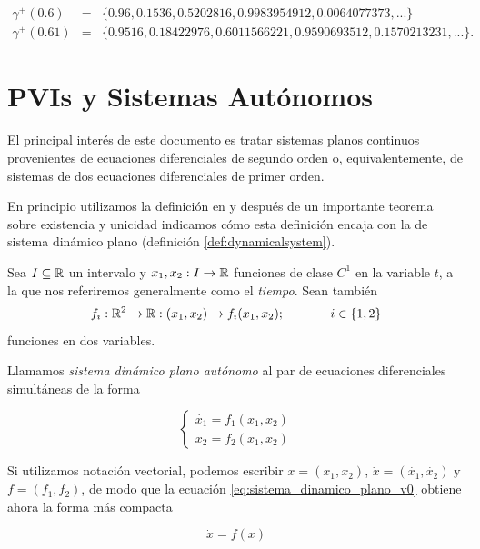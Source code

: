 \begin{example}
$$
	\begin{array}{lll}
		\gamma^+(0.6) & = & \{ 0.96, 0.1536, 0.5202816, 0.9983954912, 0.0064077373, ... \} \\
	\gamma^+(0.61) & = & \{ 0.9516, 0.18422976, 0.6011566221, 0.9590693512, 0.1570213231, ... \}.
	\end{array}
$$

\end{example}

\section{PVIs y Sistemas Autónomos}
\label{sec:propiedades_generales}

El principal interés de este documento es tratar sistemas planos continuos provenientes de ecuaciones diferenciales de segundo orden o, equivalentemente, de sistemas de dos ecuaciones diferenciales de primer orden.

En principio utilizamos la definición en \cite[p.~174]{dynandbif} y después de un importante teorema sobre existencia y unicidad indicamos cómo esta definición encaja con la de sistema dinámico plano (definición \ref{def:dynamicalsystem}).

\begin{definition} \label{def:sistema_dinamico_plano}
Sea $I \subseteq {\ensuremath{\mathbb{R}}}$ un intervalo y $x_1,x_2:I \rightarrow {\ensuremath{\mathbb{R}}}$ funciones de clase $C^1$ en la variable $t$, a la que nos referiremos generalmente como el \textit{tiempo}.
Sean también $$f_i : {\mathbb{R}}^2 \rightarrow {\ensuremath{\mathbb{R}}}: (x_1, x_2) \rightarrow f_i(x_1, x_2); \hspace{0.5in} i \in \{1,2\}$$ funciones en dos variables.

Llamamos \emph{sistema dinámico plano autónomo} al par de ecuaciones diferenciales simultáneas de la forma

\begin{equation} \label{eq:sistema_dinamico_plano_v0}
\left\{
    \begin{array}{l}
        \dot{x_1} = f_1(x_1, x_2) \\
        \dot{x_2} = f_2(x_1, x_2)
    \end{array} \right.
\end{equation}
\end{definition}

\begin{remark}
Si utilizamos notación vectorial, podemos escribir $x = (x_1, x_2)$, $\dot{x} = (\dot{x_1}, \dot{x_2})$ y $f = (f_1, f_2)$, de modo que la ecuación \ref{eq:sistema_dinamico_plano_v0} obtiene ahora la forma más compacta

\begin{equation} \label{eq:sistema_dinamico_plano}
    \dot{x} = f(x)
\end{equation}
\end{remark}

